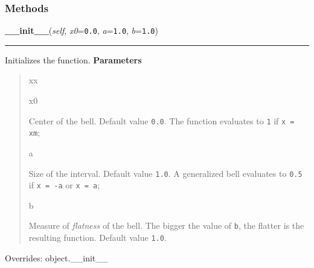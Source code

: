 
  \subsubsection{Methods}

    \vspace{0.5ex}

\hspace{.8\funcindent}\begin{boxedminipage}{\funcwidth}

    \raggedright \textbf{\_\_init\_\_}(\textit{self}, \textit{x0}={\tt 0.0}, \textit{a}={\tt 1.0}, \textit{b}={\tt 1.0})

    \vspace{-1.5ex}

    \rule{\textwidth}{0.5\fboxrule}
\setlength{\parskip}{2ex}

Initializes the function.
\setlength{\parskip}{1ex}
      \textbf{Parameters}
      \vspace{-1ex}

      \begin{quote}
        \begin{Ventry}{xx}

          \item[x0]


Center of the bell. Default value \texttt{0.0}. The function evaluates to
\texttt{1} if \texttt{x = xm};
          \item[a]


Size of the interval. Default value \texttt{1.0}. A generalized bell
evaluates to \texttt{0.5} if \texttt{x = -a} or \texttt{x = a};
          \item[b]


Measure of \emph{flatness} of the bell. The bigger the value of \texttt{b},
the flatter is the resulting function. Default value \texttt{1.0}.
        \end{Ventry}

      \end{quote}

      Overrides: object.\_\_init\_\_

    \end{boxedminipage}

    \vspace{0.5ex}

